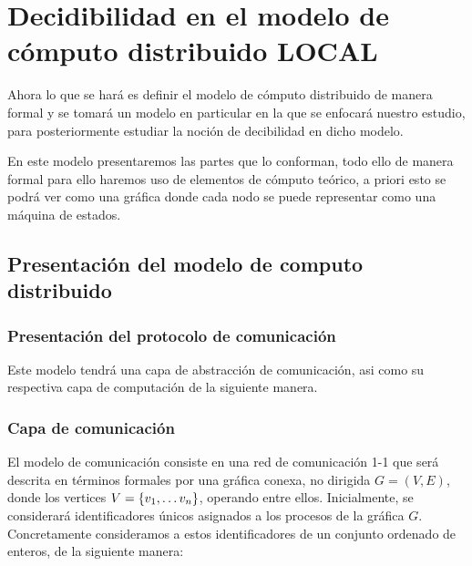 \documentclass[10pt]{report}
\begin{document}
    \section{Decidibilidad en el modelo de cómputo distribuido  \textbf{LOCAL}}\label{sec:decidibilidad-en-el-modelo-de-computo-distribuidotextbf}
    Ahora lo que se hará es definir el modelo de cómputo distribuido de manera formal
    y se tomará un modelo en particular en la que se enfocará nuestro estudio, para posteriormente
    estudiar la noción de decibilidad en dicho modelo.\newline

    En este modelo presentaremos las partes que lo conforman, todo ello de manera formal para ello
    haremos uso de elementos de cómputo teórico, a priori esto se podrá ver como una gráfica donde cada
    nodo se puede representar como una máquina de estados.



    \subsection{Presentación del modelo de computo distribuido}\label{subsec:presentación-del-modelo-de-computo-distribuido}
    \subsubsection{Presentación del protocolo de comunicación}
    Este modelo tendrá una capa de abstracción de comunicación, asi como su respectiva capa de
    computación de la siguiente manera.
    \subsubsection{Capa de comunicación}
    El modelo de comunicación consiste en una red de comunicación 1-1 que será descrita en términos formales por
    una gráfica conexa, no dirigida $G=(V,E)$, donde los vertices $V=\{ v_{1},\mathellipsis v_{n} \}$,\space
    operando entre ellos.
    Inicialmente, se considerará identificadores únicos asignados a los procesos de la gráfica $G$.\space
    Concretamente consideramos a estos identificadores de un conjunto ordenado de enteros, de la siguiente manera:
\end{document}
